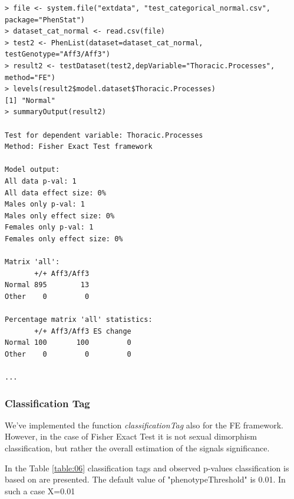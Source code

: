 \documentclass[12pt,a4paper]{article}
\begin{document}
\begingroup
    \fontsize{8pt}{12pt}\selectfont
\begin{verbatim}
> file <- system.file("extdata", "test_categorical_normal.csv", package="PhenStat") 
> dataset_cat_normal <- read.csv(file)
> test2 <- PhenList(dataset=dataset_cat_normal, testGenotype="Aff3/Aff3")
> result2 <- testDataset(test2,depVariable="Thoracic.Processes", method="FE")
> levels(result2$model.dataset$Thoracic.Processes)
[1] "Normal"
> summaryOutput(result2)

Test for dependent variable: Thoracic.Processes
Method: Fisher Exact Test framework

Model output:
All data p-val: 1
All data effect size: 0%
Males only p-val: 1
Males only effect size: 0%
Females only p-val: 1
Females only effect size: 0%

Matrix 'all':
       +/+ Aff3/Aff3
Normal 895        13
Other    0         0

Percentage matrix 'all' statistics:
       +/+ Aff3/Aff3 ES change
Normal 100       100         0
Other    0         0         0

...
\end{verbatim}
\endgroup
\subsubsection{Classification Tag}
We've implemented the function \textit{classificationTag} also for the FE framework. 
However, in the case of Fisher Exact Test it is not sexual dimorphism classification, but rather the overall estimation of the signals significance.

In the Table \ref{table:06} classification tags and observed p-values classification is based on are presented.  The default value of "phenotypeThreshold" is 0.01. In such a case X=0.01
\end{document}
